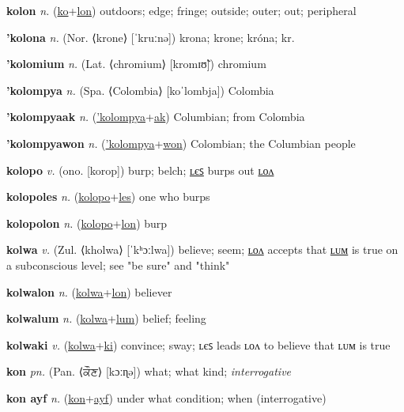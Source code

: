 \textbf{\hypertarget{kolon}{kolon}} \textit{n.} (\hyperlink{ko}{ko}+\allowbreak \hyperlink{lon}{lon})
outdoors; edge; fringe; outside; outer; out; peripheral

\textbf{\hypertarget{'kolona}{'kolona}} \textit{n.} (Nor. ⟨krone⟩ [ˈkruːnə])
krona; krone; króna; kr.

\textbf{\hypertarget{'kolomium}{'kolomium}} \textit{n.} (Lat. ⟨chromium⟩ [kromɪʊ̃])
chromium

\textbf{\hypertarget{'kolompya}{'kolompya}} \textit{n.} (Spa. ⟨Colombia⟩ [koˈlombja])
Colombia

\textbf{\hypertarget{'kolompyaak}{'kolompyaak}} \textit{n.} (\hyperlink{'kolompya}{'kolompya}+\allowbreak \hyperlink{ak}{ak})
Columbian; from Colombia

\textbf{\hypertarget{'kolompyawon}{'kolompyawon}} \textit{n.} (\hyperlink{'kolompya}{'kolompya}+\allowbreak \hyperlink{won}{won})
Colombian; the Columbian people

\textbf{\hypertarget{kolopo}{kolopo}} \textit{v.} (ono. [korop])
burp; belch; \hyperlink{kolopoles}{ʟєꜱ} burps out \hyperlink{kolopolon}{ʟᴏᴧ}

\textbf{\hypertarget{kolopoles}{kolopoles}} \textit{n.} (\hyperlink{kolopo}{kolopo}+\allowbreak \hyperlink{les}{les})
one who burps

\textbf{\hypertarget{kolopolon}{kolopolon}} \textit{n.} (\hyperlink{kolopo}{kolopo}+\allowbreak \hyperlink{lon}{lon})
burp

\textbf{\hypertarget{kolwa}{kolwa}} \textit{v.} (Zul. ⟨kholwa⟩ [ˈkʰɔːlwa])
believe; seem; \hyperlink{kolwalon}{ʟᴏᴧ} accepts that \hyperlink{kolwalum}{ʟᴜᴍ} is true on a subconscious level; see "be sure" and "think"

\textbf{\hypertarget{kolwalon}{kolwalon}} \textit{n.} (\hyperlink{kolwa}{kolwa}+\allowbreak \hyperlink{lon}{lon})
believer

\textbf{\hypertarget{kolwalum}{kolwalum}} \textit{n.} (\hyperlink{kolwa}{kolwa}+\allowbreak \hyperlink{lum}{lum})
belief; feeling

\textbf{\hypertarget{kolwaki}{kolwaki}} \textit{v.} (\hyperlink{kolwa}{kolwa}+\allowbreak \hyperlink{ki}{ki})
convince; sway; ʟєꜱ leads ʟᴏᴧ to believe that ʟᴜᴍ is true

\textbf{\hypertarget{kon}{kon}} \textit{pn.} (Pan. ⟨{\gurmukhi{}ਕੌਣ}⟩ [kɔːɳə])
what; what kind; \textit{interrogative}

\textbf{\hypertarget{kon ayf}{kon ayf}} \textit{n.} (\hyperlink{kon}{kon}+\allowbreak \hyperlink{ayf}{ayf})
under what condition; when (interrogative)


